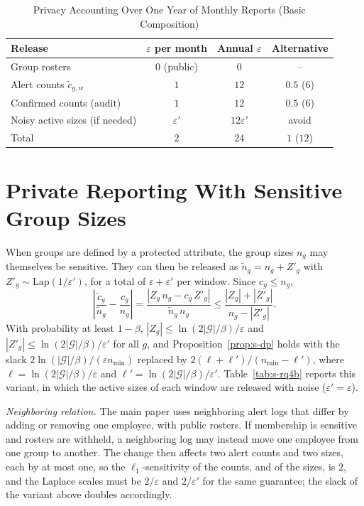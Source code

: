 \documentclass[10pt,onecolumn,letterpaper]{article}
\newcommand{\G}{\mathcal{G}}
\newcommand{\Lap}{\mathrm{Lap}}
\begin{document}
\begin{table}[!t]
\caption{Privacy Accounting Over One Year of Monthly Reports (Basic Composition)\label{tab:s-privacy}}
\centering
\setlength{\tabcolsep}{4pt}
\footnotesize
\begin{tabular}{lccc}
\toprule
Release & $\varepsilon$ per month & Annual $\varepsilon$ & Alternative \\
\midrule
Group rosters & $0$ (public) & $0$ & -- \\
Alert counts $\tilde c_{g,w}$ & $1$ & $12$ & $0.5$ ($6$) \\
Confirmed counts (audit) & $1$ & $12$ & $0.5$ ($6$) \\
Noisy active sizes (if needed) & $\varepsilon'$ & $12\varepsilon'$ & avoid \\
\midrule
Total & $2$ & $24$ & $1$ ($12$) \\
\bottomrule
\end{tabular}
\end{table}

\section{Private Reporting With Sensitive Group Sizes}
\label{sec:s-sizes}
When groups are defined by a protected attribute, the group sizes $n_g$ may themselves be sensitive. They can then be released as $\tilde{n}_g=n_g+Z'_g$ with $Z'_g\sim\Lap(1/\varepsilon')$, for a total of $\varepsilon+\varepsilon'$ per window. Since $c_g\le n_g$,
\begin{equation*}
\left|\frac{\tilde{c}_g}{\tilde{n}_g}-\frac{c_g}{n_g}\right|=\frac{|Z_g\,n_g-c_g\,Z'_g|}{\tilde{n}_g\,n_g}\le\frac{|Z_g|+|Z'_g|}{n_g-|Z'_g|}.
\end{equation*}
With probability at least $1-\beta$, $|Z_g|\le\ln(2|\G|/\beta)/\varepsilon$ and $|Z'_g|\le\ln(2|\G|/\beta)/\varepsilon'$ for all $g$, and Proposition~\ref{prop:s-dp} holds with the slack $2\ln(|\G|/\beta)/(\varepsilon n_{\min})$ replaced by $2(\ell+\ell')/(n_{\min}-\ell')$, where $\ell=\ln(2|\G|/\beta)/\varepsilon$ and $\ell'=\ln(2|\G|/\beta)/\varepsilon'$. Table~\ref{tab:s-rq4b} reports this variant, in which the active sizes of each window are released with noise ($\varepsilon'=\varepsilon$).

\emph{Neighboring relation.} The main paper uses neighboring alert logs that differ by adding or removing one employee, with public rosters. If membership is sensitive and rosters are withheld, a neighboring log may instead move one employee from one group to another. The change then affects two alert counts and two sizes, each by at most one, so the $\ell_1$-sensitivity of the counts, and of the sizes, is $2$, and the Laplace scales must be $2/\varepsilon$ and $2/\varepsilon'$ for the same guarantee; the slack of the variant above doubles accordingly.
\end{document}
